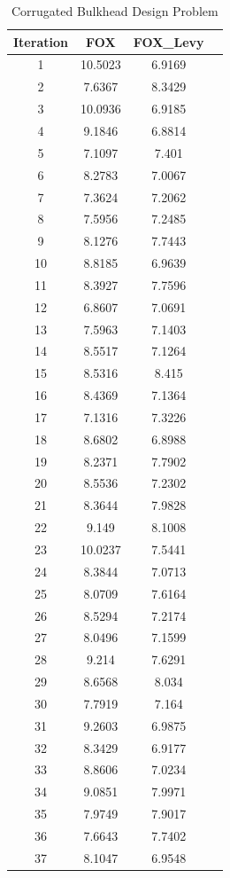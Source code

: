 \documentclass[
]{article}
\begin{document}
\begin{justify}
{\begin{table}[htbp]
\centering
\caption{Corrugated Bulkhead Design Problem}
\label{tab:fox_results}
\begin{tabular}{cccc}
\toprule
Iteration & FOX & FOX\_Levy & \\
\midrule
1 & 10.5023 & 6.9169 \\
2 & 7.6367 & 8.3429 \\
3 & 10.0936 & 6.9185 \\
4 & 9.1846 & 6.8814 \\
5 & 7.1097 & 7.401 \\
6 & 8.2783 & 7.0067 \\
7 & 7.3624 & 7.2062 \\
8 & 7.5956 & 7.2485 \\
9 & 8.1276 & 7.7443 \\
10 & 8.8185 & 6.9639 \\
11 & 8.3927 & 7.7596 \\
12 & 6.8607 & 7.0691 \\
13 & 7.5963 & 7.1403 \\
14 & 8.5517 & 7.1264 \\
15 & 8.5316 & 8.415 \\
16 & 8.4369 & 7.1364 \\
17 & 7.1316 & 7.3226 \\
18 & 8.6802 & 6.8988 \\
19 & 8.2371 & 7.7902 \\
20 & 8.5536 & 7.2302 \\
21 & 8.3644 & 7.9828 \\
22 & 9.149 & 8.1008 \\
23 & 10.0237 & 7.5441 \\
24 & 8.3844 & 7.0713 \\
25 & 8.0709 & 7.6164 \\
26 & 8.5294 & 7.2174 \\
27 & 8.0496 & 7.1599 \\
28 & 9.214 & 7.6291 \\
29 & 8.6568 & 8.034 \\
30 & 7.7919 & 7.164 \\
31 & 9.2603 & 6.9875 \\
32 & 8.3429 & 6.9177 \\
33 & 8.8606 & 7.0234 \\
34 & 9.0851 & 7.9971 \\
35 & 7.9749 & 7.9017 \\
36 & 7.6643 & 7.7402 \\
37 & 8.1047 & 6.9548 \\

\end{tabular}
\end{table}}
\end{justify}
\end{document}
